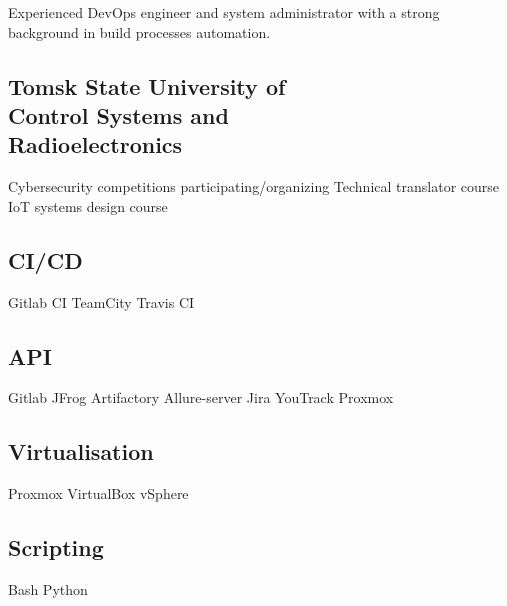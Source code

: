 \documentclass[a4paper]{MagicalCV}
\begin{document}


\begin{minipage}[t]{0.34\textwidth} 


Experienced DevOps engineer and system administrator with a strong background in build processes automation.
\sectionsep




\sectionsep


\subsection{Tomsk State University of \\ Control Systems and \\ Radioelectronics}
\vspace{\topsep} %
Cybersecurity competitions participating/organizing \textbullet{} Technical translator course \textbullet{} IoT systems design course
\sectionsep


\subsection{CI/CD}
Gitlab CI \textbullet{} 
TeamCity \textbullet{} 
Travis CI 
\subsection{API}
Gitlab \textbullet{} 
JFrog Artifactory \textbullet{} 
Allure-server \textbullet{}
Jira \textbullet{} 
YouTrack \textbullet{} 
Proxmox
\subsection{Virtualisation}
Proxmox \textbullet{} 
VirtualBox \textbullet{} 
vSphere 
\subsection{Scripting}
Bash \textbullet{} 
Python

\end{minipage}
\end{document}

